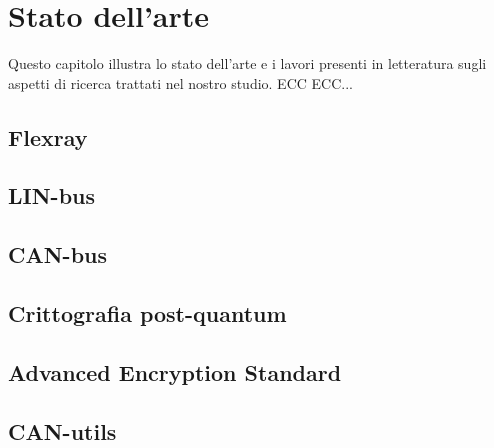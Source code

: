 \chapter{Stato dell'arte} %
%

\begin{citazione}
Questo capitolo illustra lo stato dell'arte e i lavori presenti in letteratura sugli aspetti di ricerca trattati nel nostro studio. ECC ECC...
\end{citazione}

\section{Flexray}

\section{LIN-bus}

\section{CAN-bus}

\section{Crittografia post-quantum}

\section{Advanced Encryption Standard}

\section{CAN-utils}

\newpage